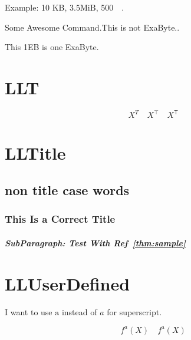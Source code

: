 \documentclass[a4paper, 10pt]{article}
\begin{document}
Example: 10 KB, $3.5\mathrm{MiB}$, \SI{500}{\giga\byte}.

\newcommand{\EB}{Some Awesome Command.This is not ExaByte.}

\EB.

This 1EB is one ExaByte.

\section{LLT}

\begin{equation*}
    X^T \quad X^\top \quad X^{\mathsf{T}}
\end{equation*}

\section{LLTitle}

\subsection{non title case words}

\subsubsection{
    This Is a Correct Title
}

\subparagraph{SubParagraph: Test With Ref~\ref{thm:sample}}

\section{LLUserDefined}

I want to use $\mathrm{a}$ instead of $a$ for superscript.

\begin{equation*}
    f^a(X) \quad f^{\mathrm{a}}(X)
\end{equation*}
\end{document}
